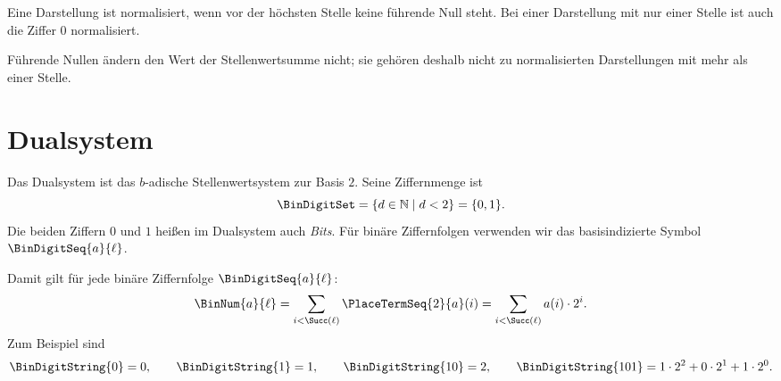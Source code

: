 \documentclass[main.tex]{subfiles}
\begin{document}
Eine Darstellung ist normalisiert, wenn vor der höchsten Stelle keine
führende Null steht. Bei einer Darstellung mit nur einer Stelle ist auch die
Ziffer \(0\) normalisiert.


Führende Nullen ändern den Wert der Stellenwertsumme nicht; sie gehören
deshalb nicht zu normalisierten Darstellungen mit mehr als einer Stelle.

\section{Dualsystem}

Das Dualsystem ist das \(b\)-adische Stellenwertsystem zur Basis \(2\). Seine
Ziffernmenge ist
\[
  \BinDigitSet
  =
  \{d\in\mathbb{N}\mid d<2\}
  =
  \{0,1\}.
\]
Die beiden Ziffern \(0\) und \(1\) heißen im Dualsystem auch \emph{Bits}. Für
binäre Ziffernfolgen verwenden wir das basisindizierte Symbol
\(\BinDigitSeq{a}{\ell}\).



Damit gilt für jede binäre Ziffernfolge \(\BinDigitSeq{a}{\ell}\):
\[
  \BinNum{a}{\ell}
  =
  \sum_{i<\Succ(\ell)} \PlaceTermSeq{2}{a}(i)
  =
  \sum_{i<\Succ(\ell)} a(i)\cdot 2^i.
\]
Zum Beispiel sind
\[
  \BinDigitString{0}=0,\qquad
  \BinDigitString{1}=1,\qquad
  \BinDigitString{10}=2,\qquad
  \BinDigitString{101}=1\cdot 2^2+0\cdot 2^1+1\cdot 2^0.
\]
\end{document}
